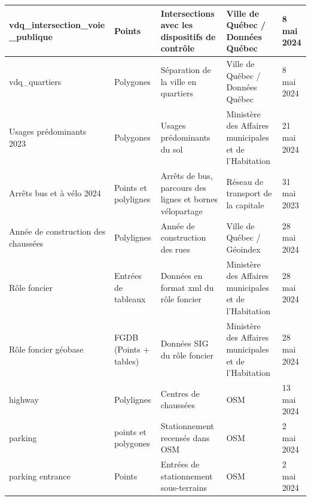 \begin{landscape}
\begin{longtable}[h!]{p{.2 \linewidth} p{.1 \linewidth} p{.3 \linewidth} p{.15\linewidth} p{.125\linewidth} }
        \hline
        vdq\_intersection\_voie \_publique & Points & Intersections avec les dispositifs de contrôle & Ville de Québec / Données Québec & 8 mai 2024 \\
        \hline
        vdq\_quartiers & Polygones &Séparation de la ville en quartiers & Ville de Québec / Données Québec & 8 mai 2024\\
        \hline
        Usages prédominants 2023  & Polygones & Usages prédominants du sol &   Ministère des Affaires municipales et de l'Habitation & 21 mai 2024 \\
        \hline
        Arrêts bus et à vélo 2024 & Points et polylignes & Arrêts de bus, parcours des lignes et bornes vélopartage & Réseau de transport de la capitale & 31 mai 2023 \\
        \hline
        Année de construction des chaussées & Polylignes & Année de construction des rues & Ville de Québec / Géoindex & 28 mai 2024 \\
        \hline
        Rôle foncier & Entrées de tableaux & Données en format xml du rôle foncier & Ministère des Affaires municipales et de l'Habitation & 28 mai 2024 \\
        \hline
        Rôle foncier géobase & FGDB (Points + tables) & Données SIG du rôle foncier & Ministère des Affaires municipales et de l'Habitation & 28 mai 2024 \\
        \hline
        highway & Polylignes & Centres de chaussées & \ac{OSM} & 13 mai 2024\\
        \hline
        parking & points et polygones & Stationnement recensés dans \ac{OSM} & \ac{OSM} & 2 mai 2024 \\
        \hline
          parking entrance & Points & Entrées de stationnement sous-terrains  & \ac{OSM} & 2 mai 2024 \\
          \hline
        
      \end{longtable}


\end{landscape}
